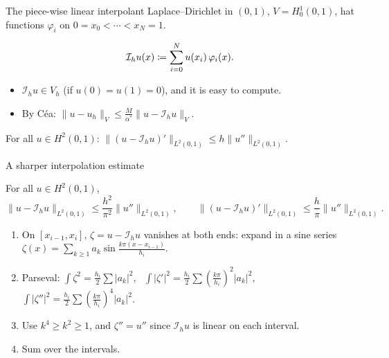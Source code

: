 \begin{frame}{The piece-wise linear interpolant}
    Laplace--Dirichlet in $(0,1)$, $V = H^1_0(0,1)$, hat functions $\varphi_i$ on $0 = x_0 < \cdots < x_N = 1$.
    \begin{definition}
        \[
            \mathcal I_h u (x) \coloneqq \sum_{i=0}^N u(x_i)\, \varphi_i(x).
        \]
    \end{definition}
    \begin{itemize}
        \item $\mathcal I_h u \in V_h$ (if $u(0) = u(1) = 0$), and it is easy to compute.
        \item By Céa: $\|u - u_h\|_V \le \frac{M}{\alpha^*} \|u - \mathcal I_h u\|_V$.
    \end{itemize}
    \begin{lemma}
        For all $u \in H^2(0,1)$: \quad
        $\displaystyle \| (u - \mathcal I_h u)' \|_{L^2(0,1)} \le h \| u'' \|_{L^2(0,1)}$.
    \end{lemma}
\end{frame}

\begin{frame}{A sharper interpolation estimate}
    \begin{lemma}[Piece-wise linear interpolation in $d=1$]
        For all $u \in H^2(0,1)$,
        \[
            \|u - \mathcal I_h u\|_{L^2(0,1)} \le \frac{h^2}{\pi^2} \|u''\|_{L^2(0,1)}, \qquad
            \|(u - \mathcal I_h u)'\|_{L^2(0,1)} \le \frac{h}{\pi} \|u''\|_{L^2(0,1)}.
        \]
    \end{lemma}
    \begin{proofsteps}
        \begin{enumerate}
            \item On $[x_{i-1}, x_i]$, $\zeta = u - \mathcal I_h u$ vanishes at both ends: expand in a sine series
                  $\zeta(x) = \sum_{k \ge 1} a_k \sin\frac{k\pi(x - x_{i-1})}{h_i}$.
            \item Parseval: $\int \zeta^2 = \frac{h_i}2\sum |a_k|^2$, \
                  $\int |\zeta'|^2 = \frac{h_i}2 \sum (\tfrac{k\pi}{h_i})^2 |a_k|^2$, \
                  $\int |\zeta''|^2 = \frac{h_i}2 \sum (\tfrac{k\pi}{h_i})^4 |a_k|^2$.
            \item Use $k^4 \ge k^2 \ge 1$, and $\zeta'' = u''$ since $\mathcal I_h u$ is linear on each interval.
            \item Sum over the intervals.
        \end{enumerate}
    \end{proofsteps}
\end{frame}

